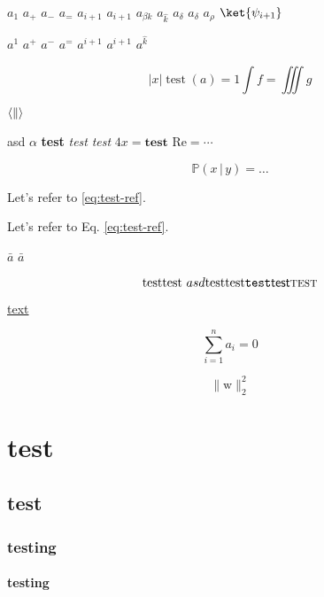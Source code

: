 \documentclass{minimal}
\begin{document}
$a_1$
$a_+$
$a_-$
$a_=$
$a_{i + 1}$
$a_{i+1}$
$a_{\beta k}$
$a_{\hat k}$
$a_{\delta}$
$a_\delta$
$a_\rho$
$\ket{\psi_{i+1}}$

$a^1$
$a^+$
$a^-$
$a^=$
$a^{i + 1}$
$a^{i+1}$
$a^{\hat k}$

\begin{equation}
  \bigl\lvert x \bigr\rvert
  \operatorname{test}(a) = 1
  \int f = \iiint g
\end{equation}

$\langle \| \\ \rangle$

\textup{asd $\alpha$}
\textbf{test}
\textit{test}
\textsl{test}
$4 \mathit{x} = \mathbf{test}$
$\mathrm{Re} = \cdots$

\begin{equation}
  \mathbb{P}(x \,|\, y) \!= \dots
  \label{eq:test-ref}
\end{equation}

Let's refer to \eqref{eq:test-ref}.

Let's refer to Eq. \ref{eq:test-ref}.

$\bar a$
$\bar{a}$

\begin{equation}
  \text{test}
  \textnormal{test $asd$}
  \textrm{test}
  \textup{test}
  \texttt{test}
  \textsf{test}
  \textsc{test}
\end{equation}

\href{url}{text}


\begin{equation}
  \sum_{i=1}^n a_i = 0
\end{equation}

$$\lVert \mathrm{w} \rVert_2^2$$

\chapter{test}

\section{test}

\subsection{testing}

\subsubsection{testing}
\end{document}

